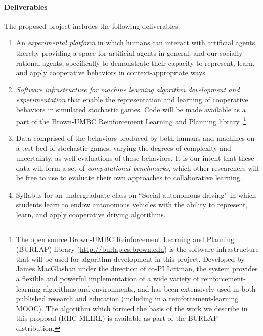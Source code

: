 
\vspace{\up}
\paragraph{Deliverables}

The proposed project includes the following deliverables: 

\begin{enumerate}

\item An {\em experimental platform\/} in which humans can interact
  with artificial agents, thereby providing a space for artificial
  agents in general, and our socially-rational agents, specifically to
  demonstrate their capacity to represent, learn, and apply
  cooperative behaviors in context-appropriate ways.

\item {\em Software infrastructure for machine learning algorithm
  development and experimentation\/} that enable the representation
  and learning of cooperative behaviors in simulated stochastic games.
  Code will be made available as a part of the Brown-UMBC
  Reinforcement Learning and Planning library.%
\footnote{The open source Brown-UMBC Reinforcement Learning and
  Planning (BURLAP) library (\url{http://burlap.cs.brown.edu}) is the
  software infrastructure that will be used for algorithm development
  in this project.  Developed by James MacGlashan under the direction
  of co-PI Littman, the system provides a flexible and powerful
  implementation of a wide variety of reinforcement-learning
  algorithms and environments, and has been extensively used in both
  published research and education (including in a
  reinforcement-learning MOOC).  The algorithm which formed the basis
  of the work we describe in this proposal (RHC-MLIRL) is available as
  part of the BURLAP distribution.}

\item Data comprised of the behaviors produced by both humans and
  machines on a test bed of stochastic games, varying the degrees of
  complexity and uncertainty, as well evaluations of those behaviors.
  It is our intent that these data will form a set of {\em
    computational benchmarks}, which other researchers will be free to
  use to evaluate their own approaches to collaborative learning.

\item Syllabus for an undergraduate class on ``Social autonomous
  driving'' in which students learn to endow autonomous vehicles with
  the ability to represent, learn, and apply cooperative driving
  algorithms.

\end{enumerate}

